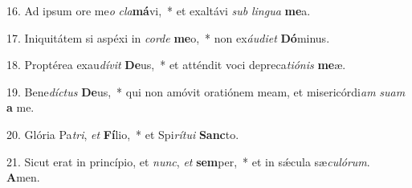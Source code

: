 16. Ad ipsum ore me\textit{o} \textit{cla}\textbf{má}vi,~*  et exaltávi \textit{sub} \textit{lin}\textit{gua} \textbf{me}a.\

17. Iniquitátem si aspéxi in \textit{cor}\textit{de} \textbf{me}o,~*  non ex\textit{áu}\textit{di}\textit{et} \textbf{Dó}minus.\

18. Proptérea exau\textit{dí}\textit{vit} \textbf{De}us,~*  et atténdit voci depreca\textit{ti}\textit{ó}\textit{nis} \textbf{me}æ.\

19. Bene\textit{díc}\textit{tus} \textbf{De}us,~*  qui non amóvit oratiónem meam, et misericórdi\textit{am} \textit{su}\textit{am} \textbf{a} me.\

20. Glória Pa\textit{tri}, \textit{et} \textbf{Fí}lio,~*  et Spi\textit{rí}\textit{tu}\textit{i} \textbf{Sanc}to.\

21. Sicut erat in princípio, et \textit{nunc}, \textit{et} \textbf{sem}per,~*  et in sǽcula sæ\textit{cu}\textit{ló}\textit{rum}. \textbf{A}men.\

